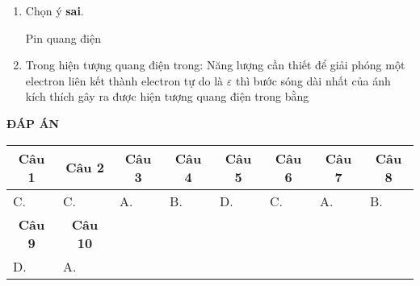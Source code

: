 \begin{enumerate}
	\item Chọn ý \textbf{sai}. 
	
	Pin quang điện
	
	\item  Trong hiện tượng quang điện trong: Năng lượng cần thiết để giải phóng một electron liên kết thành electron tự do là $\varepsilon$ thì bước sóng dài nhất của ánh kích thích gây ra được hiện tượng quang điện trong bằng
	\begin{mcq}(4)
		\item $\dfrac{hc}{\varepsilon}$.
		\item $\dfrac{h\varepsilon}{c}$.
		\item $\dfrac{\varepsilon}{hc}$.
		\item $\dfrac{c}{h\varepsilon}$.
	\end{mcq}
	
	
\end{enumerate}

\begin{center}
	\textbf{ĐÁP ÁN}
	
\end{center}

\begin{longtable}[\textwidth]{|p{}|p{}|p{}|p{}|p{}|p{}|p{}|p{}|}
	\hline%
	\multicolumn{1}{|c|}{\textbf{Câu 1}} & \multicolumn{1}{c|}{\textbf{Câu 2}} & \multicolumn{1}{c|}{\textbf{Câu 3}} &
	\multicolumn{1}{c|}{\textbf{Câu 4}} &
	\multicolumn{1}{c|}{\textbf{Câu 5}} &
	\multicolumn{1}{c|}{\textbf{Câu 6}} &
	\multicolumn{1}{c|}{\textbf{Câu 7}} &
	\multicolumn{1}{c|}{\textbf{Câu 8}}\\
	\hline
	C. &C. &A. &B. &D. &C. &A. &B.\\
	\hline
	
	\multicolumn{1}{|c|}{\textbf{Câu 9}} & \multicolumn{1}{c|}{\textbf{Câu 10}} & \multicolumn{1}{c|}{\textbf{}} &
	\multicolumn{1}{c|}{\textbf{}} &
	\multicolumn{1}{c|}{\textbf{}} &
	\multicolumn{1}{c|}{\textbf{}} &
	\multicolumn{1}{c|}{\textbf{}} &
	\multicolumn{1}{c|}{} \\
	\hline
	D. &A. & & & & & &\\
	\hline		
\end{longtable}














